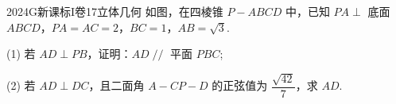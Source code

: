 
\begin{problem}{2024}{G}{新课标I卷}{17}{立体几何}
如图，在四棱锥 $P-ABCD$ 中，已知 $PA\perp$ 底面 $ABCD$，$PA=AC=2$，$BC=1$，$AB=\sqrt{3}$.

(1) 若 $AD\perp PB$，证明：$AD\mathop{//} $ 平面 $PBC$;

(2) 若 $AD\perp DC$，且二面角 $A-CP-D$ 的正弦值为 $\dfrac{\sqrt{42}}{7}$，求 $AD$.
\end{problem}